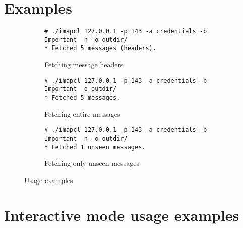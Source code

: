 \documentclass[a4]{report}
\begin{document}
\section{Examples}

\begin{figure}[h!]
\begin{subfigure}{\textwidth}
\begin{mdframed}[backgroundcolor=lightgray]
\begin{verbatim}
# ./imapcl 127.0.0.1 -p 143 -a credentials -b Important -h -o outdir/
* Fetched 5 messages (headers).
\end{verbatim}
\end{mdframed}
\caption{Fetching message headers}
\end{subfigure}
\vspace{0.5cm}

\begin{subfigure}{\textwidth}
\begin{mdframed}[backgroundcolor=lightgray]
\begin{verbatim}
# ./imapcl 127.0.0.1 -p 143 -a credentials -b Important -o outdir/
* Fetched 5 messages.
\end{verbatim}
\end{mdframed}
\caption{Fetching entire messages}
\end{subfigure}
\vspace{0.5cm}

\begin{subfigure}{\textwidth}
\begin{mdframed}[backgroundcolor=lightgray]
\begin{verbatim}
# ./imapcl 127.0.0.1 -p 143 -a credentials -b Important -n -o outdir/
* Fetched 1 unseen messages.
\end{verbatim}
\end{mdframed}
\caption{Fetching only unseen messages}
\end{subfigure}
\caption{Usage examples}
\end{figure}

\section{Interactive mode usage examples}
\end{document}
